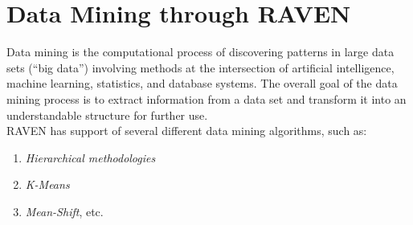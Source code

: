\section{Data Mining through RAVEN}
\label{sec:DMraven}

Data mining is the computational process of discovering patterns in large data sets (``big data'') involving methods at the intersection of artificial intelligence, machine learning, statistics, and database systems. The overall goal of the data mining process is to extract information from a data set and transform it into an understandable structure for further use.
\\RAVEN has support of several different data mining algorithms,
such as:
\begin{enumerate}
  \item \textit{Hierarchical methodologies}
  \item \textit{K-Means}
  \item \textit{Mean-Shift}, etc.
\end{enumerate}


